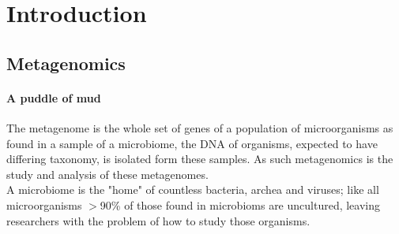 \documentclass[twocolumn]{bmcart}%
\begin{document}

\section*{Introduction}
\subsection*{Metagenomics}
\paragraph*{A puddle of mud}
The metagenome is the whole set of genes of a population of microorganisms as found in a sample of a microbiome, the DNA of organisms, expected to have differing taxonomy, is isolated form these samples. As such metagenomics is the study and analysis of these metagenomes.\cite{handelsman2004metagenomics}\\
A microbiome is the "home" of countless bacteria, archea and viruses; like all microorganisms $>$90\% of those found in microbioms are uncultured, leaving researchers with the problem of how to study those organisms.

\end{document}

